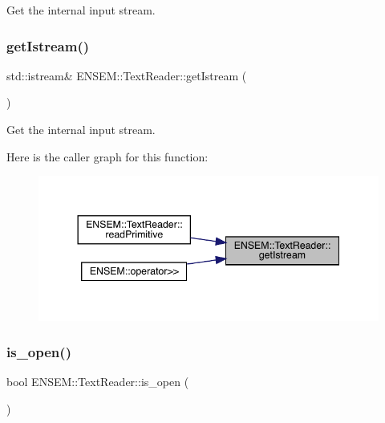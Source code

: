 Get the internal input stream. 

\mbox{\label{classENSEM_1_1TextReader_a855b7272df1bd50c18f730f3ac882428}} 
\subsubsection{\texorpdfstring{getIstream()}{getIstream()}\hspace{0.1cm}{\footnotesize\ttfamily [2/2]}}
{\footnotesize\ttfamily std\+::istream\& E\+N\+S\+E\+M\+::\+Text\+Reader\+::get\+Istream (\begin{DoxyParamCaption}{ }\end{DoxyParamCaption})\hspace{0.3cm}{\ttfamily [inline]}}



Get the internal input stream. 

Here is the caller graph for this function\+:\nopagebreak
\begin{figure}[H]
\begin{center}
\leavevmode
\includegraphics[width=344pt]{d4/d23/classENSEM_1_1TextReader_a855b7272df1bd50c18f730f3ac882428_icgraph}
\end{center}
\end{figure}
\mbox{\label{classENSEM_1_1TextReader_a67e8ac68ff413c1101522eedafc2d994}} 
\subsubsection{\texorpdfstring{is\_open()}{is\_open()}\hspace{0.1cm}{\footnotesize\ttfamily [1/2]}}
{\footnotesize\ttfamily bool E\+N\+S\+E\+M\+::\+Text\+Reader\+::is\+\_\+open (\begin{DoxyParamCaption}{ }\end{DoxyParamCaption})}



